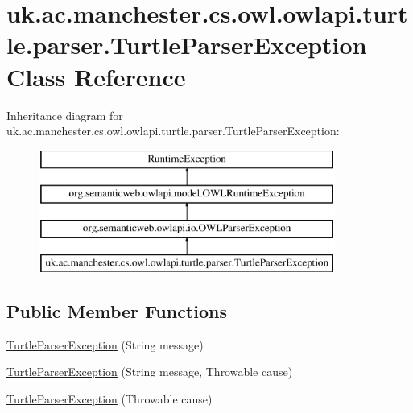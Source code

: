 \hypertarget{classuk_1_1ac_1_1manchester_1_1cs_1_1owl_1_1owlapi_1_1turtle_1_1parser_1_1_turtle_parser_exception}{\section{uk.\-ac.\-manchester.\-cs.\-owl.\-owlapi.\-turtle.\-parser.\-Turtle\-Parser\-Exception Class Reference}
\label{classuk_1_1ac_1_1manchester_1_1cs_1_1owl_1_1owlapi_1_1turtle_1_1parser_1_1_turtle_parser_exception}
}
Inheritance diagram for uk.\-ac.\-manchester.\-cs.\-owl.\-owlapi.\-turtle.\-parser.\-Turtle\-Parser\-Exception\-:\begin{figure}[H]
\begin{center}
\leavevmode
\includegraphics[height=4.000000cm]{classuk_1_1ac_1_1manchester_1_1cs_1_1owl_1_1owlapi_1_1turtle_1_1parser_1_1_turtle_parser_exception}
\end{center}
\end{figure}
\subsection*{Public Member Functions}
\begin{DoxyCompactItemize}
\item 
\hyperlink{classuk_1_1ac_1_1manchester_1_1cs_1_1owl_1_1owlapi_1_1turtle_1_1parser_1_1_turtle_parser_exception_a3d6c725f6b59958c35416e0d111062e6}{Turtle\-Parser\-Exception} (String message)
\item 
\hyperlink{classuk_1_1ac_1_1manchester_1_1cs_1_1owl_1_1owlapi_1_1turtle_1_1parser_1_1_turtle_parser_exception_a7d763a6dbf1f86a5fba7922d6a9a7a2f}{Turtle\-Parser\-Exception} (String message, Throwable cause)
\item 
\hyperlink{classuk_1_1ac_1_1manchester_1_1cs_1_1owl_1_1owlapi_1_1turtle_1_1parser_1_1_turtle_parser_exception_aa6f201e23bdb02acc74f39b59a410e0c}{Turtle\-Parser\-Exception} (Throwable cause)
\end{DoxyCompactItemize}
